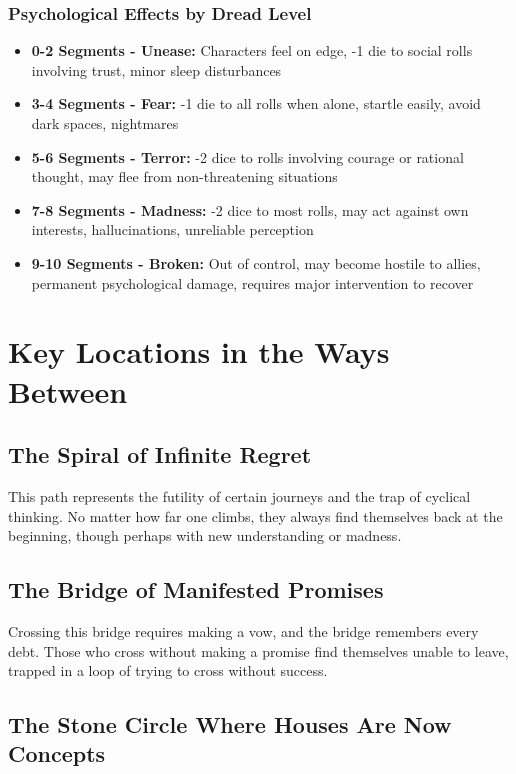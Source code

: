 \documentclass[11pt]{article}
\begin{document}
\subsubsection{Psychological Effects by Dread Level}

\begin{itemize}
\item \textbf{0-2 Segments - Unease:} Characters feel on edge, -1 die to social rolls involving trust, minor sleep disturbances
\item \textbf{3-4 Segments - Fear:} -1 die to all rolls when alone, startle easily, avoid dark spaces, nightmares
\item \textbf{5-6 Segments - Terror:} -2 dice to rolls involving courage or rational thought, may flee from non-threatening situations
\item \textbf{7-8 Segments - Madness:} -2 dice to most rolls, may act against own interests, hallucinations, unreliable perception
\item \textbf{9-10 Segments - Broken:} Out of control, may become hostile to allies, permanent psychological damage, requires major intervention to recover
\end{itemize}

\section{Key Locations in the Ways Between}

\subsection{The Spiral of Infinite Regret}

This path represents the futility of certain journeys and the trap of cyclical thinking. No matter how far one climbs, they always find themselves back at the beginning, though perhaps with new understanding or madness.

\subsection{The Bridge of Manifested Promises}

Crossing this bridge requires making a vow, and the bridge remembers every debt. Those who cross without making a promise find themselves unable to leave, trapped in a loop of trying to cross without success.

\subsection{The Stone Circle Where Houses Are Now Concepts}
\end{document}
